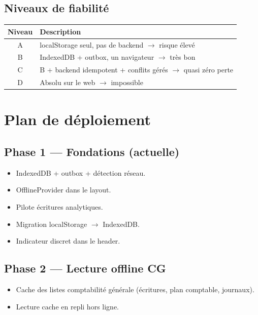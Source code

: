 \documentclass[12pt,a4paper]{report}
\begin{document}
\section{Niveaux de fiabilité}

\begin{longtable}{@{}cp{9cm}@{}}
\hline
\textbf{Niveau} & \textbf{Description} \\
\hline
A & localStorage seul, pas de backend $\rightarrow$ risque élevé \\
B & IndexedDB + outbox, un navigateur $\rightarrow$ très bon \\
C & B + backend idempotent + conflits gérés $\rightarrow$ quasi zéro perte \\
D & Absolu sur le web $\rightarrow$ impossible \\
\hline
\end{longtable}

\chapter{Plan de déploiement}

\section{Phase 1 — Fondations (actuelle)}

\begin{itemize}
  \item IndexedDB + outbox + détection réseau.
  \item OfflineProvider dans le layout.
  \item Pilote écritures analytiques.
  \item Migration localStorage $\rightarrow$ IndexedDB.
  \item Indicateur discret dans le header.
\end{itemize}

\section{Phase 2 — Lecture offline CG}

\begin{itemize}
  \item Cache des listes comptabilité générale (écritures, plan comptable, journaux).
  \item Lecture cache en repli hors ligne.
\end{itemize}
\end{document}
